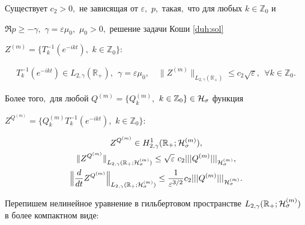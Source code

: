 \begin{lemma}[3]Существует $c_2>0,$ не зависящая от $\varepsilon,$ $ p,$ такая$,$ что для любых ${k\in \mathbb Z_0}$ и

$\Re p\ge -\gamma,$ $\gamma=\varepsilon \mu_0,$ $\mu_0>0,$ решение задачи Коши \eqref{duh:sol}

$Z^{(m)}=\{T_k^{-1}(e^{-ikt}),$ $k\in \mathbb Z_0\}{:}$

\begin{gather}

T_k^{-1}(e^{-ikt})\in L_{2,\gamma}(\mathbb R_{+}),~~ \gamma=\varepsilon \mu_0,

\label{duh:sol_constr}

\quad 

\| Z^{(m)}\|_{L_{2,\gamma}(\mathbb R_{+})}\le c_2\sqrt{\varepsilon},~~\forall k\in \mathbb Z_0.

\end{gather}

Более того$,$ для любой $Q^{(m)}=\{Q_k^{(m)},$ $k\in \mathbb Z_0\}\in {\cal H}_\sigma$ функция 

$Z^{Q^{(m)}}=\{Q_k^{(m)} T_k^{-1}(e^{-ikt}),$ $k\in \mathbb Z_0\}{:}$

\begin{gather}

Z^{Q^{(m)}} \in H^1_{2,\gamma}(\mathbb R_{+};{\cal H}^{(m)}_\sigma),

\label{duh:sol_constr}

\\

\| Z^{Q^{(m)}}\|_{L_{2,\gamma}(\mathbb R_{+};{\cal H}^{(m)}_\sigma)}\le \sqrt\varepsilon~c_2 |||Q^{(m)}|||_{{\cal H}^{(m)}_\sigma},\nonumber

\\

\Bigl\|\frac{d}{dt}Z^{Q^{(m)}}\Bigr\|_{L_{2,\gamma}(\mathbb R_{+};{\cal H}^{(m)}_\sigma)}\le \frac1{\varepsilon^{3/2}} c_2 |||Q^{(m)}|||_{{\cal H}^{(m)}_\sigma}.\nonumber

\end{gather}

\end{lemma}



\smallskip



\noindent

Перепишем нелинейное уравнение в гильбертовом пространстве $L_{2,\gamma}(\mathbb R_{+};{\cal H}^{(m)}_\sigma)$ в более компактном виде:

